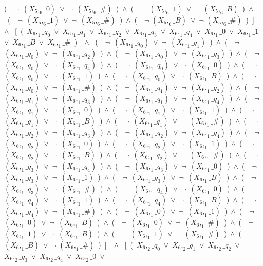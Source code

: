 ﻿\documentclass[a4paper,10pt]{article}
\begin{document}
(\ \ $\neg$\ $(X_5,_6\_0)$\ $\vee$\ $\neg$\ $(X_5,_6\_\#)$\ )\ $\wedge$\ (\ \ $\neg$\ $(X_5,_6\_1)$\ $\vee$\ $\neg$\ $(X_5,_6\_B)$\ )\ $\wedge$\ (\ \ $\neg$\ $(X_5,_6\_1)$\ $\vee$\ $\neg$\ $(X_5,_6\_\#)$\ )\ $\wedge$\ (\ \ $\neg$ $(X_5,_6\_B)$\ $\vee$\ $\neg$ $(X_5,_6\_\#)$\ )\ ]\ \ $\wedge$ \ [\ (\ $X_6,_1\_q_0$\ $\vee$\ $X_6,_1\_q_1$\ $\vee$\ $X_6,_1\_q_2$\ $\vee$\ $X_6,_1\_q_3$\ $\vee$\ $X_6,_1\_q_4$\ $\vee$\ $X_6,_1\_0$\ $\vee$\ $X_6,_1\_1$\ $\vee$\ $X_6,_1\_B$\ $\vee$\ $X_6,_1\_\#$\ )\ \ $\wedge$ \ (\ \ $\neg$\ $(X_6,_1\_q_0)$\ $\vee$\ $\neg$\ $(X_6,_1\_q_1)$\ )\ $\wedge$\ (\ \ $\neg$\ $(X_6,_1\_q_0)$\ $\vee$\ $\neg$\ $(X_6,_1\_q_2)$\ )\ $\wedge$\ (\ \ $\neg$\ $(X_6,_1\_q_0)$\ $\vee$\ $\neg$\ $(X_6,_1\_q_3)$\ )\ $\wedge$\ (\ \ $\neg$\ $(X_6,_1\_q_0)$\ $\vee$\ $\neg$\ $(X_6,_1\_q_4)$\ )\ $\wedge$\ (\ \ $\neg$\ $(X_6,_1\_q_0)$\ $\vee$\ $\neg$\ $(X_6,_1\_0)$\ )\ $\wedge$\ (\ \ $\neg$\ $(X_6,_1\_q_0)$\ $\vee$\ $\neg$\ $(X_6,_1\_1)$\ )\ $\wedge$\ (\ \ $\neg$\ $(X_6,_1\_q_0)$\ $\vee$\ $\neg$\ $(X_6,_1\_B)$\ )\ $\wedge$\ (\ \ $\neg$\ $(X_6,_1\_q_0)$\ $\vee$\ $\neg$\ $(X_6,_1\_\#)$\ )\ $\wedge$\ (\ \ $\neg$\ $(X_6,_1\_q_1)$\ $\vee$\ $\neg$\ $(X_6,_1\_q_2)$\ )\ $\wedge$\ (\ \ $\neg$\ $(X_6,_1\_q_1)$\ $\vee$\ $\neg$\ $(X_6,_1\_q_3)$\ )\ $\wedge$\ (\ \ $\neg$\ $(X_6,_1\_q_1)$\ $\vee$\ $\neg$\ $(X_6,_1\_q_4)$\ )\ $\wedge$\ (\ \ $\neg$\ $(X_6,_1\_q_1)$\ $\vee$\ $\neg$\ $(X_6,_1\_0)$\ )\ $\wedge$\ (\ \ $\neg$\ $(X_6,_1\_q_1)$\ $\vee$\ $\neg$\ $(X_6,_1\_1)$\ )\ $\wedge$\ (\ \ $\neg$\ $(X_6,_1\_q_1)$\ $\vee$\ $\neg$\ $(X_6,_1\_B)$\ )\ $\wedge$\ (\ \ $\neg$\ $(X_6,_1\_q_1)$\ $\vee$\ $\neg$\ $(X_6,_1\_\#)$\ )\ $\wedge$\ (\ \ $\neg$\ $(X_6,_1\_q_2)$\ $\vee$\ $\neg$\ $(X_6,_1\_q_3)$\ )\ $\wedge$\ (\ \ $\neg$\ $(X_6,_1\_q_2)$\ $\vee$\ $\neg$\ $(X_6,_1\_q_4)$\ )\ $\wedge$\ (\ \ $\neg$\ $(X_6,_1\_q_2)$\ $\vee$\ $\neg$\ $(X_6,_1\_0)$\ )\ $\wedge$\ (\ \ $\neg$\ $(X_6,_1\_q_2)$\ $\vee$\ $\neg$\ $(X_6,_1\_1)$\ )\ $\wedge$\ (\ \ $\neg$\ $(X_6,_1\_q_2)$\ $\vee$\ $\neg$\ $(X_6,_1\_B)$\ )\ $\wedge$\ (\ \ $\neg$\ $(X_6,_1\_q_2)$\ $\vee$\ $\neg$\ $(X_6,_1\_\#)$\ )\ $\wedge$\ (\ \ $\neg$\ $(X_6,_1\_q_3)$\ $\vee$\ $\neg$\ $(X_6,_1\_q_4)$\ )\ $\wedge$\ (\ \ $\neg$\ $(X_6,_1\_q_3)$\ $\vee$\ $\neg$\ $(X_6,_1\_0)$\ )\ $\wedge$\ (\ \ $\neg$\ $(X_6,_1\_q_3)$\ $\vee$\ $\neg$\ $(X_6,_1\_1)$\ )\ $\wedge$\ (\ \ $\neg$\ $(X_6,_1\_q_3)$\ $\vee$\ $\neg$\ $(X_6,_1\_B)$\ )\ $\wedge$\ (\ \ $\neg$\ $(X_6,_1\_q_3)$\ $\vee$\ $\neg$\ $(X_6,_1\_\#)$\ )\ $\wedge$\ (\ \ $\neg$\ $(X_6,_1\_q_4)$\ $\vee$\ $\neg$\ $(X_6,_1\_0)$\ )\ $\wedge$\ (\ \ $\neg$\ $(X_6,_1\_q_4)$\ $\vee$\ $\neg$\ $(X_6,_1\_1)$\ )\ $\wedge$\ (\ \ $\neg$\ $(X_6,_1\_q_4)$\ $\vee$\ $\neg$\ $(X_6,_1\_B)$\ )\ $\wedge$\ (\ \ $\neg$\ $(X_6,_1\_q_4)$\ $\vee$\ $\neg$\ $(X_6,_1\_\#)$\ )\ $\wedge$\ (\ \ $\neg$\ $(X_6,_1\_0)$\ $\vee$\ $\neg$\ $(X_6,_1\_1)$\ )\ $\wedge$\ (\ \ $\neg$\ $(X_6,_1\_0)$\ $\vee$\ $\neg$\ $(X_6,_1\_B)$\ )\ $\wedge$\ (\ \ $\neg$\ $(X_6,_1\_0)$\ $\vee$\ $\neg$\ $(X_6,_1\_\#)$\ )\ $\wedge$\ (\ \ $\neg$\ $(X_6,_1\_1)$\ $\vee$\ $\neg$\ $(X_6,_1\_B)$\ )\ $\wedge$\ (\ \ $\neg$\ $(X_6,_1\_1)$\ $\vee$\ $\neg$\ $(X_6,_1\_\#)$\ )\ $\wedge$\ (\ \ $\neg$ $(X_6,_1\_B)$\ $\vee$\ $\neg$ $(X_6,_1\_\#)$\ )\ ]\ \ $\wedge$ \ [\ (\ $X_6,_2\_q_0$\ $\vee$\ $X_6,_2\_q_1$\ $\vee$\ $X_6,_2\_q_2$\ $\vee$\ $X_6,_2\_q_3$\ $\vee$\ $X_6,_2\_q_4$\ $\vee$\ $X_6,_2\_0$\ $\vee$\ 
\end{document}
